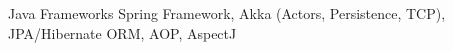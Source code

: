 \cvitem
{
  Java Frameworks
}
{
  Spring Framework, Akka (Actors, Persistence, TCP), JPA/Hibernate ORM, AOP, AspectJ
}
